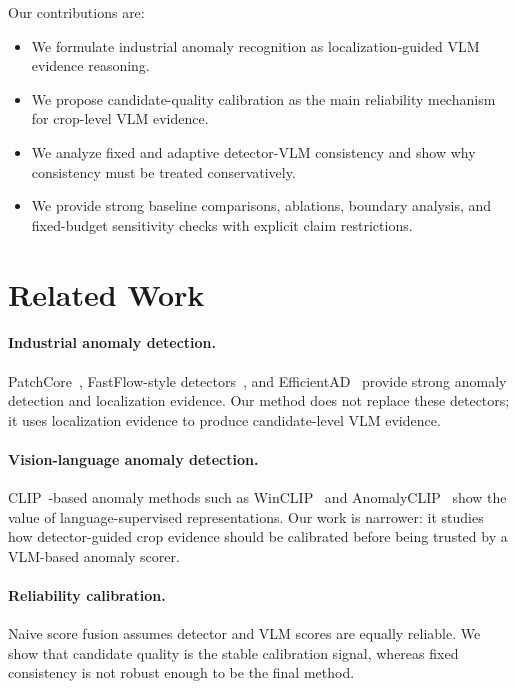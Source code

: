 \documentclass[10pt]{article}
\begin{document}
Our contributions are:
\begin{itemize}
 \item We formulate industrial anomaly recognition as localization-guided VLM evidence reasoning.
 \item We propose candidate-quality calibration as the main reliability mechanism for crop-level VLM evidence.
 \item We analyze fixed and adaptive detector-VLM consistency and show why consistency must be treated conservatively.
 \item We provide strong baseline comparisons, ablations, boundary analysis, and fixed-budget sensitivity checks with explicit claim restrictions.
\end{itemize}

\section{Related Work}

\paragraph{Industrial anomaly detection.}
PatchCore~\cite{Roth2022PatchCore}, FastFlow-style detectors~\cite{Yu2021FastFlow}, and EfficientAD~\cite{Batzner2024EfficientAD} provide strong anomaly detection and localization evidence.
Our method does not replace these detectors; it uses localization evidence to produce candidate-level VLM evidence.

\paragraph{Vision-language anomaly detection.}
CLIP~\cite{Radford2021CLIP}-based anomaly methods such as WinCLIP~\cite{Jeong2023WinCLIP} and AnomalyCLIP~\cite{Zhou2024AnomalyCLIP} show the value of language-supervised representations.
Our work is narrower: it studies how detector-guided crop evidence should be calibrated before being trusted by a VLM-based anomaly scorer.

\paragraph{Reliability calibration.}
Naive score fusion assumes detector and VLM scores are equally reliable.
We show that candidate quality is the stable calibration signal, whereas fixed consistency is not robust enough to be the final method.
\end{document}

